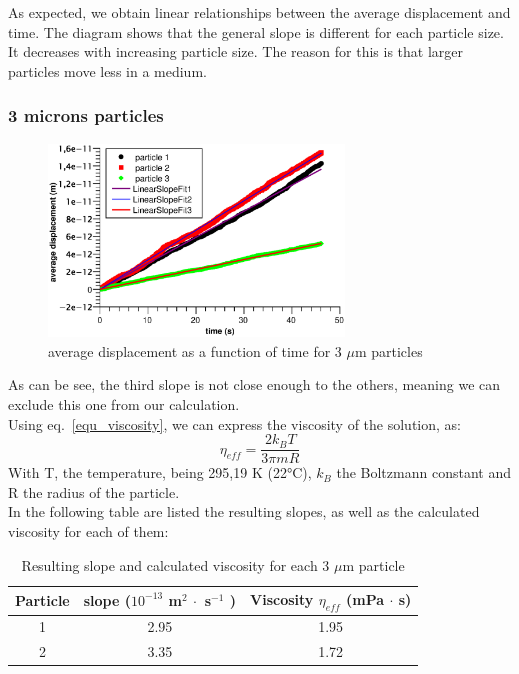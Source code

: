 \documentclass{article}
\begin{document}
As expected, we obtain linear relationships between the average displacement and time. The diagram shows that the general slope is different for each particle size. It decreases with increasing particle size. The reason for this is that larger particles move less in a medium.


\subsubsection{3 microns particles}
\begin{figure}[H]
    \centering
    \includegraphics[width=0.7\textwidth]{qti/3microns.eps}
    \caption{average displacement as a function of time for 3 $\mu$m particles}
    \label{fig:3microns}
\end{figure}
As can be see, the third slope is not close enough to the others, meaning we can exclude this one from our calculation.\\
Using eq.~\ref{equ_viscosity}, we can express the viscosity of the solution, as:
\[ \eta_{eff} = \frac{2k_BT}{3\pi m R}\]
With T, the temperature, being 295,19 K (22°C), $k_B$ the Boltzmann constant and R the radius of the particle.\\

In the following table are listed the resulting slopes, as well as the calculated viscosity for each of them:
\begin{table}[H]
    \centering
    \begin{tabular}{c|c|c}
       Particle  & slope ($10^{-13}$ m$^2 \ \cdot$ s$^{-1}$ ) & Viscosity $\eta_{eff}$ (mPa $\cdot$ s) \\
       \hline
        1 & 2.95 & 1.95\\
        2 & 3.35 & 1.72
    \end{tabular}
    \caption{Resulting slope and calculated viscosity for each 3 $\mu$m particle }
    \label{tab:viscosity3micron}
\end{table}
\end{document}
